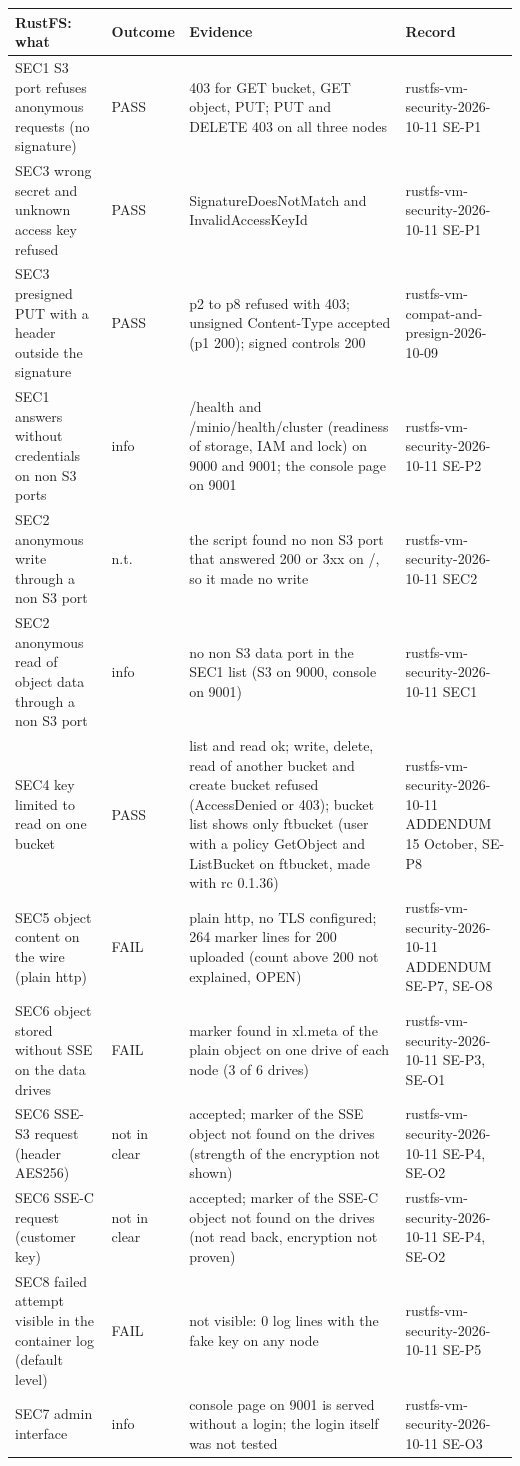 \begin{tabular}{@{}p{3.6cm}lp{7.4cm}p{3.6cm}@{}}
\toprule
RustFS: what & Outcome & Evidence & Record \\
\midrule
SEC1 S3 port refuses anonymous requests (no signature) & PASS & 403 for GET bucket, GET object, PUT; PUT and DELETE 403 on all three nodes & rustfs-vm-security-2026-10-11 SE-P1 \\
SEC3 wrong secret and unknown access key refused & PASS & SignatureDoesNotMatch and InvalidAccessKeyId & rustfs-vm-security-2026-10-11 SE-P1 \\
SEC3 presigned PUT with a header outside the signature & PASS & p2 to p8 refused with 403; unsigned Content-Type accepted (p1 200); signed controls 200 & rustfs-vm-compat-and-presign-2026-10-09 \\
SEC1 answers without credentials on non S3 ports & info & /health and /minio/health/cluster (readiness of storage, IAM and lock) on 9000 and 9001; the console page on 9001 & rustfs-vm-security-2026-10-11 SE-P2 \\
SEC2 anonymous write through a non S3 port & n.t. & the script found no non S3 port that answered 200 or 3xx on /, so it made no write & rustfs-vm-security-2026-10-11 SEC2 \\
SEC2 anonymous read of object data through a non S3 port & info & no non S3 data port in the SEC1 list (S3 on 9000, console on 9001) & rustfs-vm-security-2026-10-11 SEC1 \\
SEC4 key limited to read on one bucket & PASS & list and read ok; write, delete, read of another bucket and create bucket refused (AccessDenied or 403); bucket list shows only ftbucket (user with a policy GetObject and ListBucket on ftbucket, made with rc 0.1.36) & rustfs-vm-security-2026-10-11 ADDENDUM 15 October, SE-P8 \\
SEC5 object content on the wire (plain http) & FAIL & plain http, no TLS configured; 264 marker lines for 200 uploaded (count above 200 not explained, OPEN) & rustfs-vm-security-2026-10-11 ADDENDUM SE-P7, SE-O8 \\
SEC6 object stored without SSE on the data drives & FAIL & marker found in xl.meta of the plain object on one drive of each node (3 of 6 drives) & rustfs-vm-security-2026-10-11 SE-P3, SE-O1 \\
SEC6 SSE-S3 request (header AES256) & not in clear & accepted; marker of the SSE object not found on the drives (strength of the encryption not shown) & rustfs-vm-security-2026-10-11 SE-P4, SE-O2 \\
SEC6 SSE-C request (customer key) & not in clear & accepted; marker of the SSE-C object not found on the drives (not read back, encryption not proven) & rustfs-vm-security-2026-10-11 SE-P4, SE-O2 \\
SEC8 failed attempt visible in the container log (default level) & FAIL & not visible: 0 log lines with the fake key on any node & rustfs-vm-security-2026-10-11 SE-P5 \\
SEC7 admin interface & info & console page on 9001 is served without a login; the login itself was not tested & rustfs-vm-security-2026-10-11 SE-O3 \\
\bottomrule
\end{tabular}
